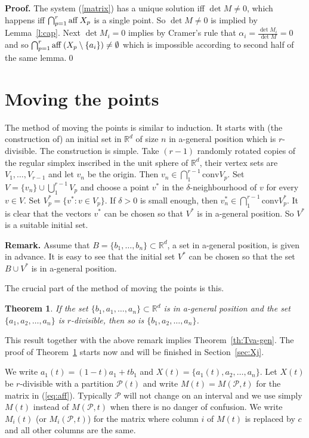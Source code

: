 \documentclass[12pt,a4paper]{amsart}
\newtheorem{theorem}{Theorem}[section]
\newcommand{\al}{\alpha}
\newcommand{\R}{\mathbb{R}}
\newcommand{\conv}{\mathrm{conv}}
\newcommand{\p}{\mathcal{P}}
\newcommand{\aff}{\textrm{aff\;}}
\numberwithin{equation}{section}
\begin{document}
{\bf Proof.} The system (\ref{matrix}) has a unique solution iff $\det M\ne 0$, which happens iff $\bigcap_{p=1}^r \aff X_p$ is a single point. So $\det M\ne 0$ is implied by Lemma~\ref{l:cap}. Next $\det M_i =0$ implies by Cramer's rule that $\al_i=\frac{\det M_i}{\det M} =0$ and so  $\bigcap_{p=1}^r \aff (X_p\setminus \{a_i\})\ne \emptyset$ which is impossible according to second half of the same lemma.\qed


\section{Moving the points}\label{sec:moving}

The method of moving the points is similar to induction. It starts with (the construction of) an initial set in $\R^d$ of size $n$ in a-general position which is $r$-divisible. The construction is simple. Take $(r-1)$ randomly rotated copies of the regular simplex inscribed in the unit sphere of $\R^d$, their vertex sets are $V_1,\ldots,V_{r-1}$ and let $v_n$ be the origin. Then $v_n \in \bigcap_1^{r-1}\conv V_p$. Set $V=\{v_n\}\cup \bigcup_1^{r-1}V_p$ and choose a point $v^*$ in the $\delta$-neighbourhood of $v$ for every $v \in V$. Set $V_p^*=\{v^*: v\in V_p\}$. If $\delta>0$ is small enough, then $v_n^*\in \bigcap_1^{r-1}\conv V_p^*$. It is clear that the vectors $v^*$ can be chosen so that $V^*$ is in a-general position. So $V^*$ is a suitable initial set. 

\smallskip
{\bf Remark.} Assume that $B=\{b_1,\ldots,b_n\}\subset \R^d$, a set in a-general position, is given in advance. It is easy to see that the initial set $V^*$ can be chosen so that the set $B \cup V^*$ is in a-general position. 

\smallskip
The crucial part of the method of moving the points is this.

\begin{theorem}\label{th:induc} If the set $\{b_1,a_1,\ldots,a_n\}\subset \R^d$ is in a-general position and the set $\{a_1,a_2,\ldots,a_n\}$ is $r$-divisible, then so is $\{b_1,a_2,\ldots,a_n\}$.
\end{theorem}

This result together with the above remark implies Theorem~\ref{th:Tva-gen}. The proof of Theorem~\ref{th:induc} starts now and will be finished in Section~\ref{sec:Xj}.

\smallskip
We write $a_1(t)=(1-t)a_1+tb_1$ and $X(t)=\{a_1(t),a_2,\ldots,a_n\}$. Let $X(t)$ be $r$-divisible with a partition $\p(t)$ and write $M(t)=M(\p,t)$ for the matrix in (\ref{eq:aff}). Typically $\p$ will not change on an interval and we use simply $M(t)$ instead of $M(\p,t)$ when there is no danger of confusion. We write $M_i(t)$ (or $M_i(\p,t)$) for the matrix where column $i$ of $M(t)$ is replaced by $c$ and all other columns are the same.
\end{document}
